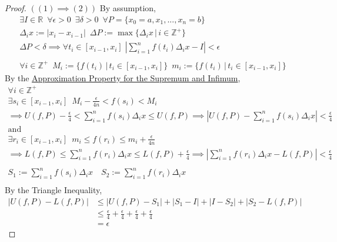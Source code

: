 \documentclass[11pt, oneside]{book}
\theoremstyle{break}
\newtheorem*{proof}{Proof}
\newcommand{\bb}[1]{\mathbb{#1}}			%
\begin{document}
\begin{proof}
	$((1) \implies (2))$
	By assumption,
	\begin{gather*}
		\exists I \in \bb{R} \enspace \forall \epsilon > 0 \enspace \exists \delta > 0 \enspace \forall P = \{x_0 = a, x_1, ..., x_n = b\} \\
		\Delta_i x := |x_i - x_{i-1}| \enspace \Delta P := \max\{\Delta_i x \, | \, i \in \bb{Z}^+\} \\
		\Delta P < \delta \implies \forall t_i \in [x_{i-1}, x_i] \; \left| \sum_{i=1}^{n} f(t_i) \Delta_i x - I \right| < \epsilon \\
		\\
		\forall i \in \bb{Z}^+ \enspace M_i := \{f(t_i) \, | \, t_i \in [x_{i-1}, x_i] \} \enspace m_i := \{f(t_i) \, | \, t_i \in [x_{i-1}, x_i]\}
	\end{gather*}
	By the \hyperref[approx_prop]{Approximation Property for the Supremum and Infimum},
	\begin{gather*}
		\forall i \in \bb{Z}^+ \\
		\exists s_i \in [x_{i-1}, x_i] \enspace M_i - \frac{\epsilon}{4n} < f(s_i) < M_i \\
		\implies U(f, P) - \frac{\epsilon}{4} < \sum_{i=1}^{n} f(s_i) \Delta_i x \leq U(f, P) \implies \left| U(f, P) - \sum_{i=1}^{n} f(s_i) \Delta_i x \right| < \frac{\epsilon}{4} \\
		\text{and} \\
		\exists r_i \in [x_{i-1}, x_i] \enspace m_i \leq f(r_i) \leq m_i + \frac{\epsilon}{4n} \\
		\implies L(f, P) \leq \sum_{i=1}^{n} f(r_i) \Delta_i x \leq L(f, P) + \frac{\epsilon}{4} \implies \left| \sum_{i=1}^{n} f(r_i) \Delta_i x - L(f, P) \right| < \frac{\epsilon}{4} \\
		\\
		S_1 := \sum_{i=1}^{n} f(s_i) \Delta_i x \quad S_2 := \sum_{i=1}^{n} f(r_i) \Delta_i x \\
	\end{gather*}
	By the Triangle Inequality,
	\begin{align*}
		|U(f, P) - L(f, P)| &\leq |U(f, P) - S_1| + |S_1 - I| + |I - S_2| + |S_2 - L(f, P)| \\
							&\leq \frac{\epsilon}{4} + \frac{\epsilon}{4} + \frac{\epsilon}{4} + \frac{\epsilon}{4} \\
							&= \epsilon
	\end{align*}


\end{proof}
\end{document}
